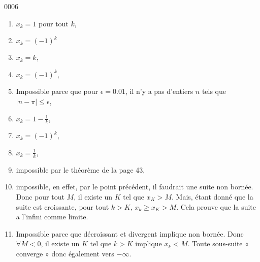 
\begin{corrige}{0006}

\begin{enumerate}
\item $x_k=1$ pour tout $k$,
\item $x_k=(-1)^k$
\item $x_k=k$,
\item $x_k=(-1)^k$,
\item Impossible parce que pour $\epsilon=0.01$, il n'y a pas d'entiers $n$ tels que $| n-\pi |\leq\epsilon$,
\item $x_k=1-\frac{1}{ k }$,
\item $x_k=(-1)^k$,
\item $x_k=\frac{1}{ k }$,
\item impossible par le théorème de la page 43,
\item impossible, en effet, par le point précédent, il faudrait une suite non bornée. Donc pour tout $M$, il existe un $K$ tel que $x_K>M$. Mais, étant donné que la suite est croissante, pour tout $k>K$, $x_k\geq x_K>M$. Cela prouve que la suite a l'infini comme limite.
\item Impossible parce que décroissant et divergent implique non bornée. Donc $\forall M<0$, il existe un $K$ tel que $k>K$ implique $x_k<M$. Toute sous-suite « converge » donc également vers $-\infty$.
\end{enumerate}


\end{corrige}
